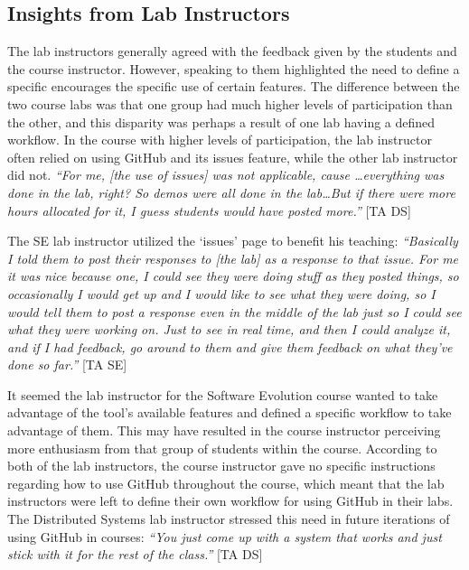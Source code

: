 

\subsection{Insights from Lab Instructors}
The lab instructors generally agreed with the feedback given by the students and the course instructor. However, speaking to them highlighted the need to define a specific encourages the specific use of certain features. The difference between the two course labs was that one group had much higher levels of participation than the other, and this disparity was perhaps a result of one lab having a defined workflow. In the course with higher levels of participation, the lab instructor often relied on using GitHub and its issues feature, while the other lab instructor did not. \textit{``For me, [the use of issues] was not applicable, cause \ldots everything was done in the lab, right? So demos were all done in the lab\ldots But if there were more hours allocated for it, I guess students would have posted more.''} [TA DS]

The SE lab instructor utilized the `issues' page to benefit his teaching: \textit{``Basically I told them to post their responses to [the lab] as a response to that issue. For me it was nice because one, I could see they were doing stuff as they posted things, so occasionally I would get up and I would like to see what they were doing, so I would tell them to post a response even in the middle of the lab just so I could see what they were working on. Just to see in real time, and then I could analyze it, and if I had feedback, go around to them and give them feedback on what they've done so far.''} [TA SE]

It seemed the lab instructor for the Software Evolution course wanted to take advantage of the tool's available features and defined a specific workflow to take advantage of them. This may have resulted in the course instructor perceiving more enthusiasm from that group of students within the course. According to both of the lab instructors, the course instructor gave no specific instructions regarding how to use GitHub throughout the course, which meant that the lab instructors were left to define their own workflow for using GitHub in their labs. The Distributed Systems lab instructor stressed this need in future iterations of using GitHub in courses: \textit{``You just come up with a system that works and just stick with it for the rest of the class.''} [TA DS]


